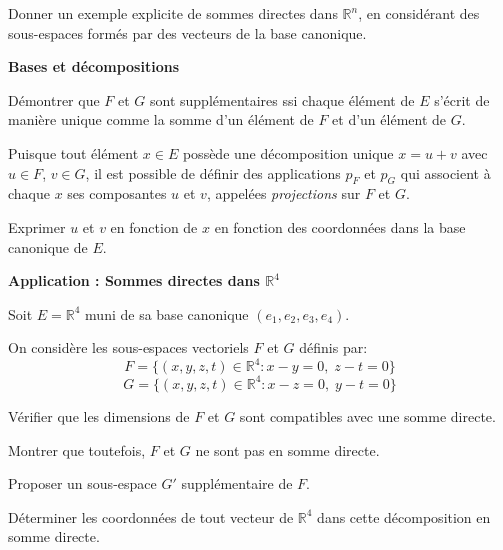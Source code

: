 \documentclass[10pt,a4paper]{article}
\begin{document}
\q Donner un exemple explicite de sommes directes dans $\mathbb{R}^n$, en considérant des
sous-espaces formés par des vecteurs de la base canonique.

\bigskip
\textbf{Bases et décompositions}

\q Démontrer que $F$ et $G$ sont supplémentaires ssi chaque élément de $E$ s'écrit de manière unique
comme la somme d'un élément de $F$ et d'un élément de $G$.

\bigskip
Puisque tout élément $x \in E$ possède une décomposition unique $x = u + v$ avec $u \in F$, $v \in
G$, il est possible de définir des applications $p_F$ et $p_G$ qui associent à chaque $x$ ses
composantes $u$ et $v$, appelées \textit{projections} sur $F$ et $G$.

\q Exprimer $u$ et $v$ en fonction de $x$ en fonction des coordonnées dans la base canonique de $E$.

\bigskip
\textbf{Application : Sommes directes dans $\mathbb{R}^4$}

Soit $E = \mathbb{R}^4$ muni de sa base canonique $(e_1, e_2, e_3, e_4)$.

On considère les sous-espaces vectoriels $F$ et $G$ définis par:
\[ F = \{ (x, y, z, t) \in \mathbb{R}^4 : x - y = 0, \; z - t = 0 \} \]
\[ G = \{ (x, y, z, t) \in \mathbb{R}^4 : x - z = 0, \; y - t = 0 \} \]

\q Vérifier que les dimensions de $F$ et $G$ sont compatibles avec une somme directe.

\q Montrer que toutefois, $F$ et $G$ ne sont pas en somme directe.

\q Proposer un sous-espace $G'$ supplémentaire de $F$.

\q Déterminer les coordonnées de tout vecteur de \( \mathbb{R}^4 \) dans cette décomposition en
somme directe.
\end{document}
